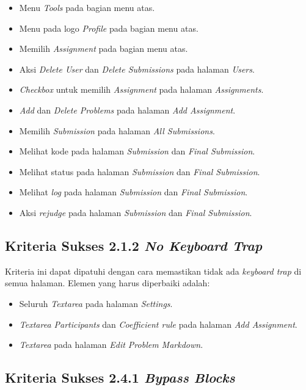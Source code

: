 \begin{itemize}
	\item Menu \textit{Tools} pada bagian menu atas.
	\item Menu pada logo \textit{Profile} pada bagian menu atas.
	\item Memilih \textit{Assignment} pada bagian menu atas.
	\item Aksi \textit{Delete User} dan \textit{Delete Submissions} pada halaman \textit{Users}.
	\item \textit{Checkbox} untuk memilih \textit{Assignment} pada halaman \textit{Assignments}.
	\item \textit{Add} dan \textit{Delete Problems} pada halaman \textit{Add Assignment}.
	\item Memilih \textit{Submission} pada halaman \textit{All Submissions}.
	\item Melihat kode pada halaman \textit{Submission} dan \textit{Final Submission}.
	\item Melihat status pada halaman \textit{Submission} dan \textit{Final Submission}.
	\item Melihat \textit{log} pada halaman \textit{Submission} dan \textit{Final Submission}.
	\item Aksi \textit{rejudge} pada halaman \textit{Submission} dan \textit{Final Submission}.
\end{itemize}

\subsection{Kriteria Sukses 2.1.2 \textit{No Keyboard Trap}}
\label{subsec:peningkatan_A_2.1.2}
Kriteria ini dapat dipatuhi dengan cara memastikan tidak ada \textit{keyboard trap} di semua halaman. Elemen yang harus diperbaiki adalah:

\begin{itemize}
	\item Seluruh \textit{Textarea} pada halaman \textit{Settings}.
	\item \textit{Textarea Participants} dan \textit{Coefficient rule} pada halaman \textit{Add Assignment}.
	\item \textit{Textarea} pada halaman \textit{Edit Problem Markdown}.
\end{itemize}

\subsection{Kriteria Sukses 2.4.1 \textit{Bypass Blocks}}
\label{subsec:peningkatan_A_2.4.1}

